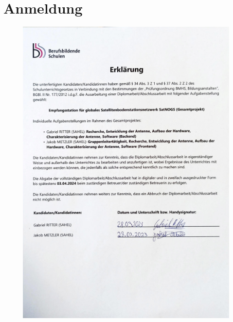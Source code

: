 \chapter{Anmeldung}
\begin{figure} [H]
	\centering
	\includegraphics[width=.75\linewidth]{../ref/anmeldung.png}
	\label{fig:anmeldung}
\end{figure}